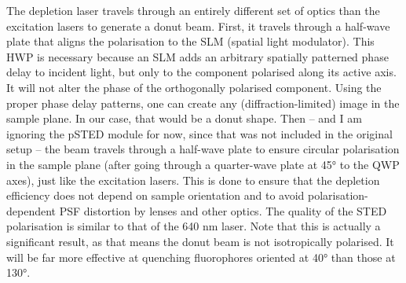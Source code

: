 The depletion laser travels through an entirely different set of optics than the excitation lasers to generate a donut beam. First, it travels through a half-wave plate that aligns the polarisation to the SLM (spatial light modulator). This HWP is necessary because an SLM adds an arbitrary spatially patterned phase delay to incident light, but only to the component polarised along its active axis. It will not alter the phase of the orthogonally polarised component. Using the proper phase delay patterns, one can create any (diffraction-limited) image in the sample plane. In our case, that would be a donut shape. Then -- and I am ignoring the pSTED module for now, since that was not included in the original setup -- the beam travels through a half-wave plate to ensure circular polarisation in the sample plane (after going through a quarter-wave plate at \ang{45} to the QWP axes), just like the excitation lasers. This is done to ensure that the depletion efficiency does not depend on sample orientation and to avoid polarisation-dependent PSF distortion by lenses and other optics. The quality of the STED polarisation is similar to that of the 640 nm laser. Note that this is actually a significant result, as that means the donut beam is not isotropically polarised. It will be far more effective at quenching fluorophores oriented at \ang{40} than those at \ang{130}.

